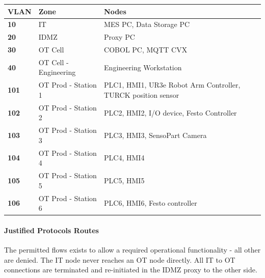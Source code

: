 \renewcommand{\arraystretch}{1.3} %
\begin{tabularx}{\textwidth}{>{\bfseries}p{2.5cm} X X}
    VLAN & \textbf{Zone} & \textbf{Nodes} \vspace{0.5em}\\
\toprule
    10 & IT & MES PC, Data Storage PC \\
    20 & IDMZ & Proxy PC\\
    30 & OT Cell & COBOL PC, MQTT CVX \\
    40 & OT Cell - Engineering & Engineering Workstation  \\
    101 & OT Prod - Station 1 & PLC1, HMI1, UR3e Robot Arm Controller, TURCK position sensor \\
    102 & OT Prod - Station 2 & PLC2, HMI2, I/O device, Festo Controller \\
    103 & OT Prod - Station 3 & PLC3, HMI3, SensoPart Camera \\
    104 & OT Prod - Station 4 & PLC4, HMI4 \\
    105 & OT Prod - Station 5 & PLC5, HMI5 \\
    106 & OT Prod - Station 6 & PLC6, HMI6, Festo controller \\
\end{tabularx}

\pagebreak
\paragraph{Justified Protocols Routes}
The permitted flows exists to allow a required operational
functionality - all other are denied.
The IT node never reaches an OT node directly. All IT to OT connections are terminated
and re-initiated in the IDMZ proxy to the other side. \\ \vspace{1em}

